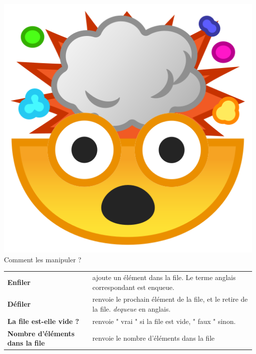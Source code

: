 \includegraphics[scale=0.03]{Common_blob/mindblow.png}{\selectfont
Comment les manipuler ?\\
}

\begin{tabular}{l|l}
     \textbf{Enfiler} & ajoute un élément dans la file. Le terme anglais correspondant est enqueue.\\
     \textbf{Défiler} & renvoie le prochain élément de la file, et le retire de la file. \textit{dequeue} en anglais.\\
     \textbf{La file est-elle vide ?} & renvoie  " vrai  " si la file est vide,  " faux  " sinon.\\
     \textbf{Nombre d'éléments dans la file} & renvoie le nombre d'éléments dans la file \\[0.5cm]
\end{tabular}



